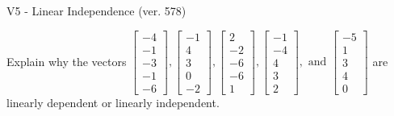 \begin{exercise}
  \begin{exerciseTitle}V5 - Linear Independence (ver. 578)\end{exerciseTitle}
  \begin{exerciseStatement}
    Explain why the vectors \(\left[\begin{array}{r}
-4 \\
-1 \\
-3 \\
-1 \\
-6
\end{array}\right] , \left[\begin{array}{r}
-1 \\
4 \\
3 \\
0 \\
-2
\end{array}\right] , \left[\begin{array}{r}
2 \\
-2 \\
-6 \\
-6 \\
1
\end{array}\right] , \left[\begin{array}{r}
-1 \\
-4 \\
4 \\
3 \\
2
\end{array}\right] , \text{ and } \left[\begin{array}{r}
-5 \\
1 \\
3 \\
4 \\
0
\end{array}\right]\) are linearly dependent or linearly independent.	



\end{exerciseStatement}
\end{exercise}
